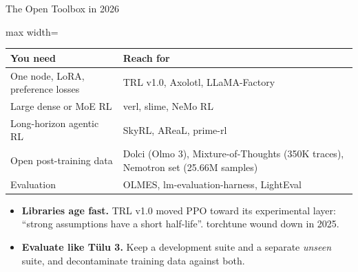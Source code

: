 \begin{frame}{The Open Toolbox in 2026}
    \begin{center}
    \small
    \begin{adjustbox}{max width=\linewidth}\begin{tabular}{>{\raggedright\arraybackslash}p{4.3cm}>{\raggedright\arraybackslash}p{9.0cm}}
        \toprule
        \textbf{You need} & \textbf{Reach for} \\
        \midrule
        One node, LoRA, preference losses & TRL v1.0, Axolotl, LLaMA-Factory \\
        Large dense or MoE RL & verl, slime, NeMo RL \\
        Long-horizon agentic RL & SkyRL, AReaL, prime-rl \\
        Open post-training data & Dolci (Olmo 3), Mixture-of-Thoughts (350K traces), Nemotron set (25.66M samples) \\
        Evaluation & OLMES, lm-evaluation-harness, LightEval \\
        \bottomrule
    \end{tabular}\end{adjustbox}
    \end{center}
    \begin{itemize}\itemsep0.4em
        \item \textbf{Libraries age fast.} TRL v1.0 moved PPO toward its experimental layer: ``strong assumptions have a short half-life''. torchtune wound down in 2025.
        \item \textbf{Evaluate like T\"ulu 3.} Keep a development suite and a separate \emph{unseen} suite, and decontaminate training data against both.
    \end{itemize}
\end{frame}

